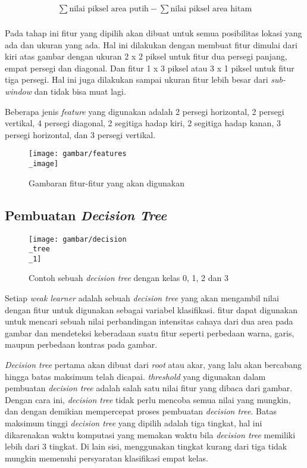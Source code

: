 \begin{equation}
  \begin{split}
    \sum \text{nilai piksel area putih} -  \sum \text{nilai piksel area hitam} \\ 
  \end{split}
\end{equation}

Pada tahap ini fitur yang dipilih akan dibuat untuk semua 
posibilitas lokasi yang ada dan ukuran yang ada. Hal ini dilakukan dengan 
membuat fitur dimulai dari kiri atas gambar dengan ukuran 2 x 2 piksel untuk fitur 
dua persegi panjang, empat persegi dan diagonal. Dan fitur 1 x 3 piksel atau 3 x 1 piksel untuk 
fitur tiga persegi. Hal ini juga dilakukan sampai ukuran fitur lebih besar 
dari \emph{sub-window} dan tidak bisa muat lagi.

Beberapa jenis \textit{feature} yang digunakan adalah 2 persegi horizontal, 
2 persegi vertikal, 4 persegi diagonal, 2 segitiga hadap kiri, 2 segitiga hadap kanan, 
3 persegi horizontal, dan 3 persegi vertikal.

\begin{figure}[H]
  \centering{}
	\texttt{[image: gambar/features\\\_image]}
  \caption{Gambaran fitur-fitur yang akan digunakan}
\end{figure} 

\subsection{Pembuatan \textit{Decision Tree}}

\begin{figure}[H]
  \centering{}
	\texttt{[image: gambar/decision\\\_tree\\\_1]}
  \caption{Contoh sebuah \textit{decision tree} dengan kelas 0, 1, 2 dan 3}
\end{figure} 

Setiap \emph{weak learner} adalah sebuah \emph{decision tree} yang akan mengambil nilai 
dengan fitur untuk digunakan sebagai variabel klasifikasi.
fitur dapat digunakan untuk mencari 
sebuah nilai perbandingan intensitas cahaya dari dua area pada gambar dan 
mendeteksi keberadaan suatu fitur seperti 
perbedaan warna, garis, maupun perbedaan kontras pada gambar.

\textit{Decision tree} pertama akan dibuat dari \textit{root} atau akar, yang lalu 
akan bercabang hingga batas maksimum telah dicapai. \textit{threshold} yang digunakan 
dalam pembuatan \textit{decision tree} adalah salah satu nilai fitur yang dibaca dari gambar. 
Dengan cara ini, \textit{decision tree} tidak perlu mencoba semua nilai yang mungkin, dan 
dengan demikian mempercepat proses pembuatan \textit{decision tree}.
Batas maksimum tinggi \textit{decision tree }yang dipilih adalah tiga 
tingkat, hal ini dikarenakan waktu komputasi yang memakan waktu bila \textit{decision tree} 
memiliki lebih dari 3 tingkat. Di lain sisi, menggunakan tingkat kurang dari tiga tidak mungkin 
memenuhi persyaratan klasifikasi empat kelas.

